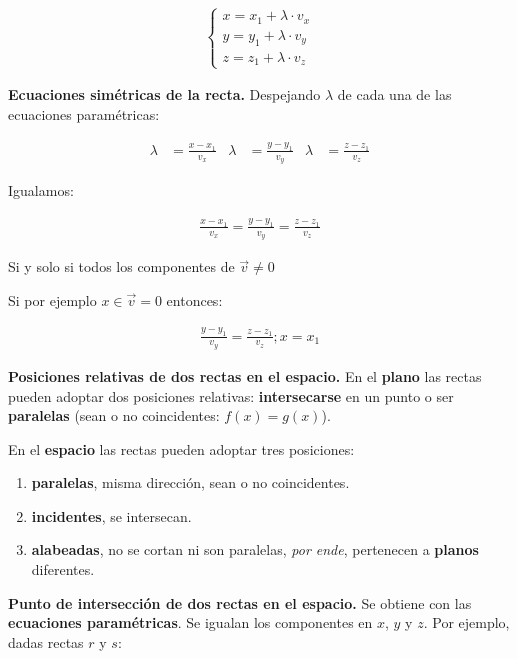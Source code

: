 \documentclass{article}
\begin{document}
\begin{align*}
    \begin{cases}
        x = x_1 + \lambda \cdot v_x \\
        y = y_1 + \lambda \cdot v_y \\
        z = z_1 + \lambda \cdot v_z
    \end{cases}
\end{align*}

\textbf{Ecuaciones simétricas de la recta.}
Despejando \(\lambda\) de cada una de las ecuaciones paramétricas:

\begin{align*}
    \lambda & = \frac{x - x_1}{v_x} & \lambda & = \frac{y - y_1}{v_y} & \lambda & = \frac{z - z_1}{v_z}
\end{align*}

Igualamos:

\begin{align*}
    \frac{x - x_1}{v_x} = \frac{y - y_1}{v_y} = \frac{z - z_1}{v_z}
\end{align*}

Si y solo si todos los componentes de \(\vec{v} \neq 0\)

Si por ejemplo \(x \in \vec{v} = 0\) entonces:

\begin{align*}
    \frac{y - y_1}{v_y} = \frac{z - z_1}{v_z}; x = x_1
\end{align*}

\textbf{Posiciones relativas de dos rectas en el espacio.}
En el \textbf{plano} las rectas pueden adoptar dos posiciones relativas:
\textbf{intersecarse} en un punto o ser \textbf{paralelas}
(sean o no coincidentes: \(f(x) = g(x)\)).

En el \textbf{espacio} las rectas pueden adoptar tres posiciones:

\begin{enumerate}
    \item \textbf{paralelas}, misma dirección, sean o no coincidentes.
    \item \textbf{incidentes}, se intersecan.
    \item \textbf{alabeadas}, no se cortan ni son paralelas,
          \textit{por ende}, pertenecen a \textbf{planos} diferentes.
\end{enumerate}

\textbf{Punto de intersección de dos rectas en el espacio.}
Se obtiene con las \textbf{ecuaciones paramétricas}.
Se igualan los componentes en $x$, $y$ y $z$.
Por ejemplo, dadas rectas \(r\) y \(s\):
\end{document}
